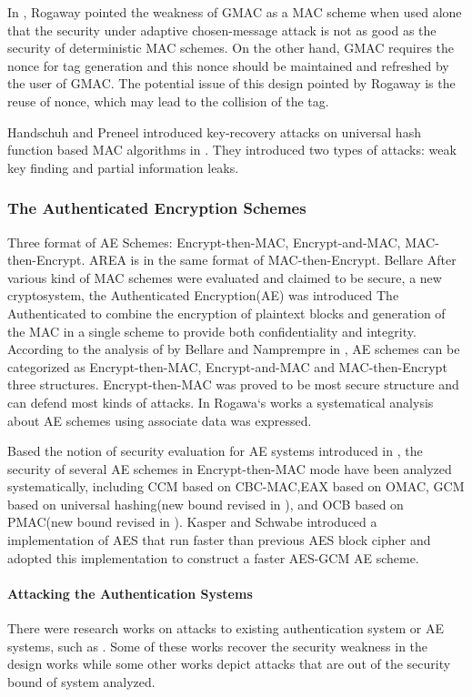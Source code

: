\documentclass{article}
\begin{document}
In \cite{Rogaway2011}, Rogaway pointed the weakness of GMAC as a MAC scheme when used alone that the security under adaptive chosen-message attack is not as good as the security of deterministic MAC schemes. On the other hand, GMAC requires the nonce for tag generation and this nonce should be maintained and refreshed by the user of GMAC. The potential issue of this design pointed by Rogaway is the reuse of nonce, which may lead to the collision of the tag. 

Handschuh and Preneel introduced key-recovery attacks on universal hash function based MAC algorithms in \cite{key_recover}. They introduced two types of attacks: weak key finding and partial information leaks.

\subsubsection{The Authenticated Encryption Schemes}
Three format of AE Schemes: Encrypt-then-MAC, Encrypt-and-MAC, MAC-then-Encrypt. AREA is in the same format of MAC-then-Encrypt. 
Bellare 
After various kind of MAC schemes were evaluated and claimed to be secure, a new cryptosystem, the Authenticated Encryption(AE) was introduced The Authenticated to combine the encryption of
plaintext blocks and generation of the MAC in a single scheme to provide both
confidentiality and integrity. According to the analysis of by Bellare and Namprempre in \cite{ae-notion}, AE schemes can be categorized as Encrypt-then-MAC, Encrypt-and-MAC and MAC-then-Encrypt three structures. Encrypt-then-MAC was proved to be most secure structure and can defend most kinds of attacks. 
In Rogawa`s works \cite{aead} a systematical analysis about AE
schemes using associate data was expressed.  

Based the notion of security evaluation for AE systems introduced in \cite{aead}, the security of several AE schemes in
Encrypt-then-MAC mode have been analyzed systematically, including CCM \cite{ccm}based on
CBC-MAC,EAX\cite{eax} based on OMAC, GCM
\cite{gcm} based on universal hashing(new bound revised in \cite{breaking}), and
OCB\cite{ocb} based on PMAC(new bound revised in \cite{tweak,iPMAC}). Kasper and
Schwabe introduced a implementation of AES that run faster than previous AES block cipher
and adopted this implementation to construct a faster AES-GCM AE
scheme\cite{fast}.

\paragraph{Attacking the Authentication Systems}
There were research works on attacks to existing authentication system or AE systems, such as
\cite{cycle,attack_blk,hardware_attack}. Some of these works recover the security weakness in the design works while some other works depict attacks that are out of the security bound of system analyzed. 
\end{document}
